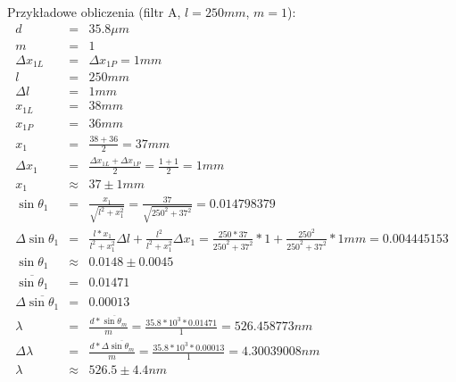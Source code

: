 \documentclass[wide,a4paper,titlepage,12pt]{mwart}
\begin{document}
Przykładowe obliczenia (filtr A, $l=250mm$, $m=1$):
\begin{eqnarray*}
	d &=&  35.8 \mu m \\
	m &=& 1 \\
	\Delta x_{1L} &=& \Delta x_{1P} = 1mm \\
	l &=& 250mm \\
	\Delta l &=& 1mm \\
	x_{1L} &=& 38mm \\
	x_{1P} &=& 36mm \\
	x_1 &=& \frac{38+36}{2} = 37 mm \\
	\Delta x_1 &=& \frac{\Delta x_{1L} + \Delta x_{1P}}{2} = \frac{1 + 1}{2} = 1 mm \\
	x_1 &\approx& 37 \pm 1 mm \\
	\sin{\theta_1} &=& \frac{x_1}{\sqrt{l^2 + x_1^2}} = \frac{37}{\sqrt{250^2 + 37^2}} = 0.014798379 \\
	\Delta \sin{\theta_1} &=& \frac{l*x_1}{l^2 + x_1^2}\Delta l + \frac{l^2}{l^2 + x_1^2} \Delta x_1 = \frac{250 * 37}{250^2 + 37^2}*1 + \frac{250^2}{250^2 + 37^2}*1mm = 0.004445153 \\
	\sin{\theta_1} &\approx& 0.0148 \pm 0.0045 \\
	\overline{\sin{\theta_1}} &=& 0.01471 \\
	\Delta \overline{\sin{\theta_1}} &=& 0.00013 \\
	\lambda &=& \frac{d*\overline{\sin{\theta_m}}}{m} = \frac{35.8 * 10^3 * 0.01471}{1} = 526.458773 nm \\
	\Delta \lambda &=& \frac{d*\Delta \overline{\sin{\theta_m}}}{m} = \frac{35.8 * 10^3 * 0.00013}{1} = 4.30039008 nm \\
	\lambda &\approx& 526.5 \pm 4.4 nm
\end{eqnarray*}
	
\end{document}
